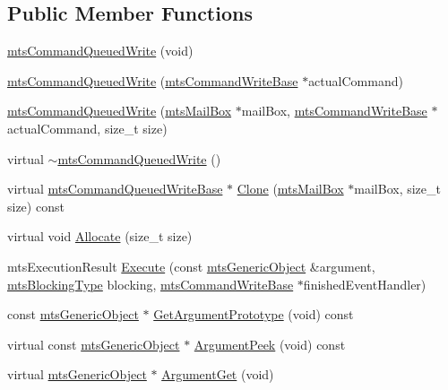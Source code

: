 \subsection*{Public Member Functions}
\begin{DoxyCompactItemize}
\item 
\hyperlink{classmts_command_queued_write_a4858efe1420cb5840040042f1b2ca57a}{mts\+Command\+Queued\+Write} (void)
\item 
\hyperlink{classmts_command_queued_write_a7000aca27b43b4085556e5fbb1fca4f0}{mts\+Command\+Queued\+Write} (\hyperlink{classmts_command_write_base}{mts\+Command\+Write\+Base} $\ast$actual\+Command)
\item 
\hyperlink{classmts_command_queued_write_a380711a5f40d7c15a07cc807c505a3f3}{mts\+Command\+Queued\+Write} (\hyperlink{classmts_mail_box}{mts\+Mail\+Box} $\ast$mail\+Box, \hyperlink{classmts_command_write_base}{mts\+Command\+Write\+Base} $\ast$actual\+Command, size\+\_\+t size)
\item 
virtual \hyperlink{classmts_command_queued_write_a1984fe21945f207e3f7e9e879d16cf67}{$\sim$mts\+Command\+Queued\+Write} ()
\item 
virtual \hyperlink{classmts_command_queued_write_base}{mts\+Command\+Queued\+Write\+Base} $\ast$ \hyperlink{classmts_command_queued_write_a7a083a9a4beb94394cd590c33bc0799a}{Clone} (\hyperlink{classmts_mail_box}{mts\+Mail\+Box} $\ast$mail\+Box, size\+\_\+t size) const 
\item 
virtual void \hyperlink{classmts_command_queued_write_a708715a7f63ed3d31aa8ef57c15d5bcb}{Allocate} (size\+\_\+t size)
\item 
mts\+Execution\+Result \hyperlink{classmts_command_queued_write_aac9bc57a48b9cb773327c1020df0cabf}{Execute} (const \hyperlink{classmts_generic_object}{mts\+Generic\+Object} \&argument, \hyperlink{mts_forward_declarations_8h_ad7426ccb6c883bc780d0ee197dddcbe7}{mts\+Blocking\+Type} blocking, \hyperlink{classmts_command_write_base}{mts\+Command\+Write\+Base} $\ast$finished\+Event\+Handler)
\item 
const \hyperlink{classmts_generic_object}{mts\+Generic\+Object} $\ast$ \hyperlink{classmts_command_queued_write_adf14fc179c04c9532b8f2500550bd37c}{Get\+Argument\+Prototype} (void) const 
\item 
virtual const \hyperlink{classmts_generic_object}{mts\+Generic\+Object} $\ast$ \hyperlink{classmts_command_queued_write_a720c2911ca6dff95951947ee393acb9e}{Argument\+Peek} (void) const 
\item 
virtual \hyperlink{classmts_generic_object}{mts\+Generic\+Object} $\ast$ \hyperlink{classmts_command_queued_write_a6ca68723d7a73d8c2e365a45c9f2518a}{Argument\+Get} (void)
\end{DoxyCompactItemize}
